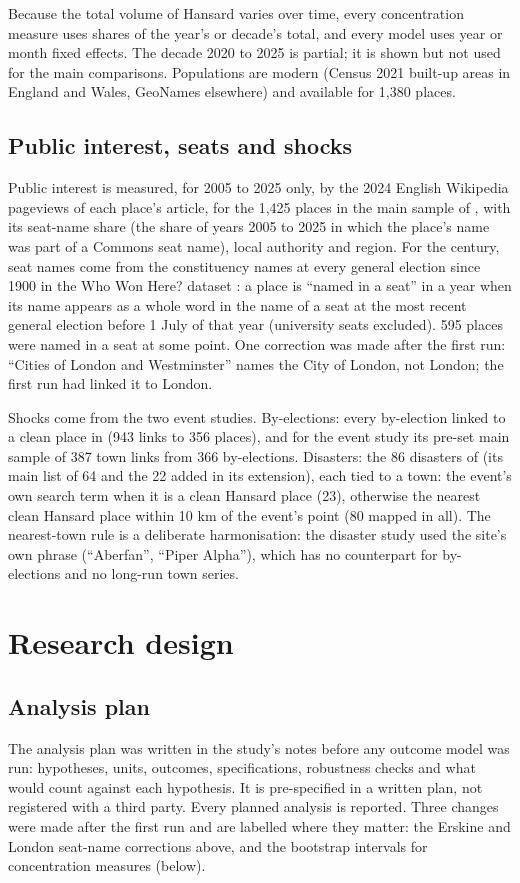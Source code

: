 \documentclass[11pt,a4paper]{article}
\begin{document}
Because the total volume of Hansard varies over time, every concentration measure uses shares of the year's or decade's total, and every model uses year or month fixed effects. The decade 2020 to 2025 is partial; it is shown but not used for the main comparisons. Populations are modern (Census 2021 built-up areas in England and Wales, GeoNames elsewhere) and available for 1,380 places.

\subsection{Public interest, seats and shocks}
Public interest is measured, for 2005 to 2025 only, by the 2024 English Wikipedia pageviews of each place's article, for the 1,425 places in the main sample of \citet{hotham2026b}, with its seat-name share (the share of years 2005 to 2025 in which the place's name was part of a Commons seat name), local authority and region. For the century, seat names come from the constituency names at every general election since 1900 in the Who Won Here? dataset \citep{hotham2026e}: a place is ``named in a seat'' in a year when its name appears as a whole word in the name of a seat at the most recent general election before 1 July of that year (university seats excluded). 595 places were named in a seat at some point. One correction was made after the first run: ``Cities of London and Westminster'' names the City of London, not London; the first run had linked it to London.

Shocks come from the two event studies. By-elections: every by-election linked to a clean place in \citet{hotham2026c} (943 links to 356 places), and for the event study its pre-set main sample of 387 town links from 366 by-elections. Disasters: the 86 disasters of \citet{hotham2026d} (its main list of 64 and the 22 added in its extension), each tied to a town: the event's own search term when it is a clean Hansard place (23), otherwise the nearest clean Hansard place within 10 km of the event's point (80 mapped in all). The nearest-town rule is a deliberate harmonisation: the disaster study used the site's own phrase (``Aberfan'', ``Piper Alpha''), which has no counterpart for by-elections and no long-run town series.

\section{Research design}\label{sec:design}
\subsection{Analysis plan}
The analysis plan was written in the study's notes before any outcome model was run: hypotheses, units, outcomes, specifications, robustness checks and what would count against each hypothesis. It is pre-specified in a written plan, not registered with a third party. Every planned analysis is reported. Three changes were made after the first run and are labelled where they matter: the Erskine and London seat-name corrections above, and the bootstrap intervals for concentration measures (below).
\end{document}
